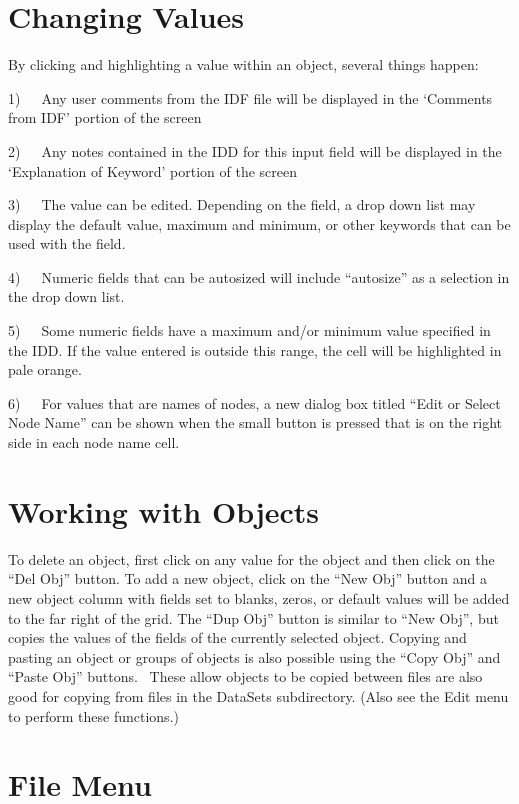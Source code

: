 \section{Changing Values}\label{changing-values}

By clicking and highlighting a value within an object, several things happen:

1)~~~Any user comments from the IDF file will be displayed in the `Comments from IDF' portion of the screen

2)~~~Any notes contained in the IDD for this input field will be displayed in the `Explanation of Keyword' portion of the screen

3)~~~The value can be edited. Depending on the field, a drop down list may display the default value, maximum and minimum, or other keywords that can be used with the field.

4)~~~Numeric fields that can be autosized will include ``autosize'' as a selection in the drop down list.

5)~~~Some numeric fields have a maximum and/or minimum value specified in the IDD. If the value entered is outside this range, the cell will be highlighted in pale orange.

6)~~~For values that are names of nodes, a new dialog box titled ``Edit or Select Node Name'' can be shown when the small button is pressed that is on the right side in each node name cell.

\section{Working with Objects}\label{working-with-objects}

To delete an object, first click on any value for the object and then click on the ``Del Obj'' button. To add a new object, click on the ``New Obj'' button and a new object column with fields set to blanks, zeros, or default values will be added to the far right of the grid. The ``Dup Obj'' button is similar to ``New Obj'', but copies the values of the fields of the currently selected object. Copying and pasting an object or groups of objects is also possible using the ``Copy Obj'' and ``Paste Obj'' buttons.~ These allow objects to be copied between files are also good for copying from files in the DataSets subdirectory. (Also see the Edit menu to perform these functions.)

\section{File Menu}\label{file-menu-000}

